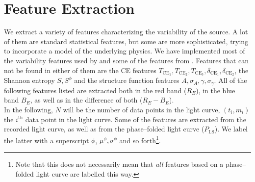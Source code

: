 
\section{Feature Extraction}
\label{sec:feature-extraction}

We extract a variety of features characterizing the variability of the source. A lot of them are standard statistical features, but some are more sophisticated, trying to incorporate a model of the underlying physics. We have implemented most of the variability features used by \citet{kim2014} and some of the features from \citet{dubath2011}. Features that can not be found in either of them are the CE features $T_{\text{CE}_1}, T_{\text{CE}_2}, T_{\text{CE}_3}, \delta_{\text{CE}_1}, \delta_{\text{CE}_2}$, the Shannon entropy $S, S^\phi$ and the structure function features $A, \sigma_A, \gamma, \sigma_\gamma$. All of the following features listed are extracted both in the red band ($R_E$), in the blue band $B_E$, as well as in the difference of both ($R_E - B_E$).\\

In the following, $N$ will be the number of data points in the light curve, $(t_i, m_i)$ the $i^{\text{th}}$ data point in the light curve. Some of the features are extracted from the recorded light curve, as well as from the phase--folded light curve ($P_{\text{LS}}$). We label the latter with a superscript $\phi$, \eg $\mu^\phi, \sigma^\phi$ and so forth\footnote{Note that this does not necessarily mean that \emph{all} features based on a phase--folded light curve are labelled this way.}.

